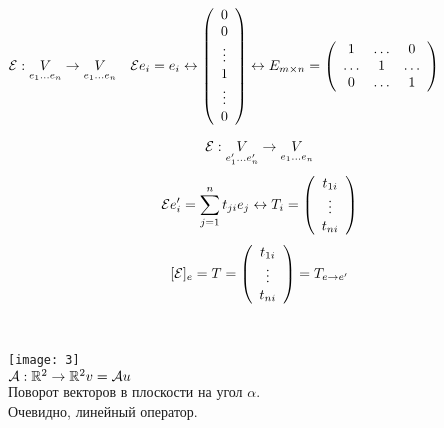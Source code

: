 \documentclass[../spring.tex]{subfiles}
\begin{document}
	\begin{examples}
		\ \\
		\begin{mylist}
			\item
			$\E:\underset{e_1 \ldots e_n}{V} \rightarrow \underset{e_1 \ldots e_n}{V} \ \ \ 
			\E e_i = e_i \leftrightarrow
			\left( 
			\begin{array}{c}
			0\\
			0\\
			\vdots\\
			1\\
			\vdots\\
			0
			\end{array}
			\right)
			\leftrightarrow E_{m\times n} = \left(
			\begin{array}{ccc}
			1 & \ldots & 0\\
			\ldots & 1 & \ldots\\
			0 & \ldots & 1
			\end{array}
			\right)
			$
			\item 
			$$\mathcal{E}: \underset{e'_1\ldots e'_n}{V} \rightarrow \underset{e_1\ldots e_n}{V}$$
			$$
			\mathcal{E} e'_i =  \sum_{j = 1}^{n}t_{ji}e_j \leftrightarrow T_i = 
			\left(
			\begin{array}{c}
			t_{1i}\\
			\vdots\\
			t_{ni}
			\end{array}
			\right)$$
			$$
			[ \mathcal{E} ] _e = T = 
			\left(
			\begin{array}{c}
			t_{1i}\\
			\vdots\\
			t_{ni}
			\end{array}
			\right)
			= T_{e\rightarrow e'}
			$$
			\item \ \\
			\begin{multicols}{2}
				\texttt{[image: 3]}\\
				$\mathcal{A}: \mathbb R^2 \rightarrow \mathbb R^2\\
				v = \mathcal{A} u$\\
				Поворот векторов в плоскости на угол $\alpha$. \\
				Очевидно, линейный оператор.
			\end{multicols}
\end{mylist}
\end{examples}
\end{document}
